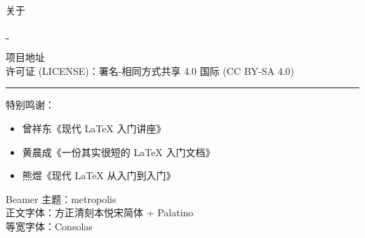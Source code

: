 \begin{frame}{关于}
    \vspace*{0.2cm}
    \begin{center}
        \huge
        \href{https://creativecommons.org/licenses/by-sa/4.0/}{\faCreativeCommons\,\faCreativeCommonsBy\,\faCreativeCommonsSa}
    \end{center}

    \medskip
    \footnotesize
    项目地址 \href{https://github.com/PKSTU/}{\faGithub}\\
    许可证 (LICENSE)：署名-相同方式共享 4.0 国际 (CC BY-SA 4.0)

    \begin{center}
        \rule{0.8\textwidth}{1pt}
    \end{center}

    \medskip
    特别鸣谢：
    \scriptsize
    \begin{itemize}
        \item 曾祥东《现代 \LaTeX{} 入门讲座》 \href{https://github.com/stone-zeng/latex-talk}{\faGithub}
        \item 黄晨成《一份其实很短的 \LaTeX{} 入门文档》 
        \item 熊煜《现代 \LaTeX{} 从入门到入门》 \href{https://git.nju.edu.cn/atXYblip/latex-lecture}{\faGitlab}
    \end{itemize}

    \begin{flushleft}
        \tiny
        Beamer 主题：metropolis  \\
        正文字体：方正清刻本悦宋简体 + Palatino \\
        等宽字体：Consolas
    \end{flushleft}
    \vspace{-0.5cm}
\end{frame}